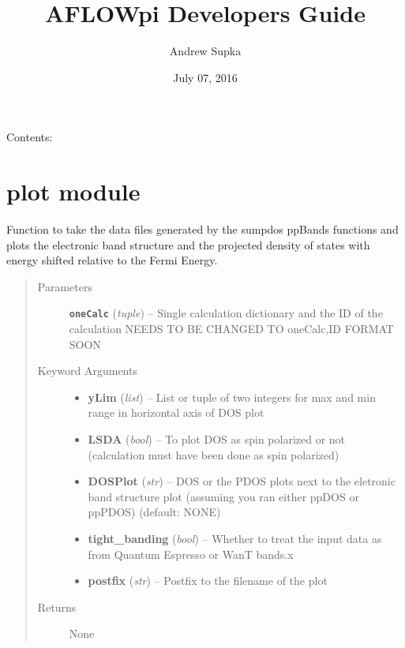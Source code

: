 \documentclass[letterpaper,10pt,english]{sphinxmanual}
\title{AFLOWpi Developers Guide}
\date{July 07, 2016}
\author{Andrew Supka}
\begin{document}
\maketitle
\tableofcontents
{}\label{index::doc}


Contents:


\chapter{plot module}
\label{plot:module-plot}\label{plot::doc}\label{plot:plot-module}\label{plot:welcome-to-aflowpi-s-documentation}

\begin{fulllineitems}
\label{plot:plot.__bandPlot}
Function to take the data files generated by the sumpdos ppBands functions and plots
the electronic band structure and the projected density of states with energy shifted
relative to the Fermi Energy.
\begin{quote}\begin{description}
\item[{Parameters}] \leavevmode
\textbf{\texttt{oneCalc}} (\emph{tuple}) -- Single calculation dictionary and the ID of the calculation
NEEDS TO BE CHANGED TO oneCalc,ID FORMAT SOON

\item[{Keyword Arguments}] \leavevmode\begin{itemize}
\item {} 
\textbf{yLim} (\emph{list}) --
List or tuple of two integers for max and min range in horizontal axis of DOS plot

\item {} 
\textbf{LSDA} (\emph{bool}) --
To plot DOS as spin polarized or not (calculation must have been done as spin polarized)

\item {} 
\textbf{DOSPlot} (\emph{str}) --
DOS or the PDOS plots next to the eletronic band structure plot (assuming you ran
either ppDOS or ppPDOS) (default: NONE)

\item {} 
\textbf{tight\_banding} (\emph{bool}) --
Whether to treat the input data as from Quantum Espresso or WanT bands.x

\item {} 
\textbf{postfix} (\emph{str}) --
Postfix to the filename of the plot

\end{itemize}

\item[{Returns}] \leavevmode
None

\end{description}\end{quote}

\end{fulllineitems}
\end{document}

